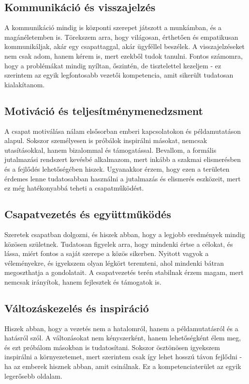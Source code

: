 \subsection{Kommunikáció és visszajelzés}

A kommunikáció mindig is központi szerepet játszott a munkámban, és a magánéletemben is.
Törekszem arra, hogy világosan, érthetően és empatikusan kommunikáljak, akár egy csapattaggal, akár ügyféllel beszélek.
A visszajelzéseket nem csak adom, hanem kérem is, mert ezekből tudok tanulni.
Fontos számomra, hogy a problémákat mindig nyíltan, őszintén, 
de tisztelettel kezeljem - ez szerintem az egyik legfontosabb vezetői kompetencia, amit sikerült tudatosan kialakítanom.

\subsection{Motiváció és teljesítménymenedzsment}

A csapat motiválása nálam elsősorban emberi kapcsolatokon és példamutatáson alapul.
Sokszor személyesen is próbálok inspirálni másokat, nemcsak utasításokkal, hanem bizalommal és támogatással.
Bevallom, a formális jutalmazási rendszert kevésbé alkalmazom, mert inkább 
a szakmai elismerésben és a fejlődés lehetőségében hiszek.
Ugyanakkor érzem, hogy ezen a területen érdemes lenne tudatosabban használni 
a jutalmazás és elismerés eszközeit, mert ez még hatékonyabbá teheti a csapatműködést.

\subsection{Csapatvezetés és együttműködés}

Szeretek csapatban dolgozni, és hiszek abban, hogy a legjobb eredmények mindig közösen születnek.
Tudatosan figyelek arra, hogy mindenki értse a célokat, és lássa, miért fontos a saját szerepe a közös sikerben.
Nyitott vagyok a véleményekre, és igyekszem olyan légkört teremteni, ahol mindenki bátran megoszthatja a gondolatait.
A csapatvezetés terén stabilnak érzem magam, mert nemcsak irányítok, hanem fejlesztek és támogatok is.

\subsection{Változáskezelés és inspiráció}

Hiszek abban, hogy a vezetés nem a hatalomról, hanem a példamutatásról és a hatásról szól.
A változásokat nem kényszerként, hanem lehetőségként élem meg, és ezt próbálom másokban is tudatosítani.
Sokszor ösztönösen igyekszem inspirálni a környezetemet, 
mert szerintem csak így lehet hosszú távon fejlődni - ha az emberek hisznek abban, amit csinálnak.
Ez a kompetenciaterület az egyik legerősebb oldalam.

